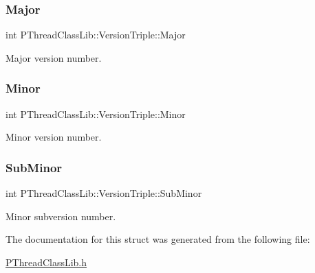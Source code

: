 \subsubsection{\texorpdfstring{Major}{Major}}
{\footnotesize\ttfamily int P\+Thread\+Class\+Lib\+::\+Version\+Triple\+::\+Major}



Major version number. 

\mbox{\label{structPThreadClassLib_1_1VersionTriple_ad937fe83d89788c30241f937bb8ddb37}} 
\subsubsection{\texorpdfstring{Minor}{Minor}}
{\footnotesize\ttfamily int P\+Thread\+Class\+Lib\+::\+Version\+Triple\+::\+Minor}



Minor version number. 

\mbox{\label{structPThreadClassLib_1_1VersionTriple_a51341849d79f4a8077291a4502fb4840}} 
\subsubsection{\texorpdfstring{Sub\+Minor}{SubMinor}}
{\footnotesize\ttfamily int P\+Thread\+Class\+Lib\+::\+Version\+Triple\+::\+Sub\+Minor}



Minor subversion number. 



The documentation for this struct was generated from the following file\+:\begin{DoxyCompactItemize}
\item 
\hyperlink{PThreadClassLib_8h}{P\+Thread\+Class\+Lib.\+h}\end{DoxyCompactItemize}
